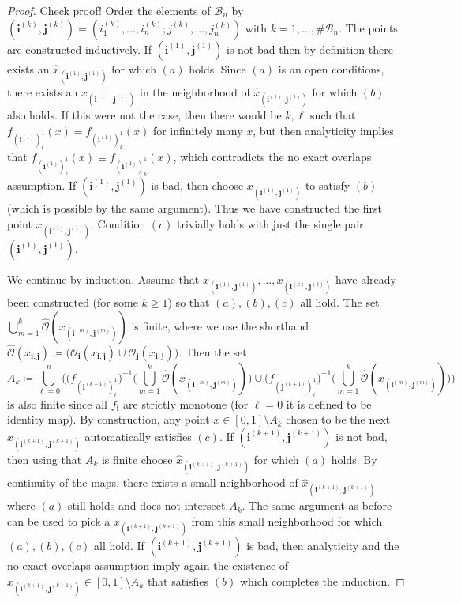\documentclass[12pt,]{article}
\theoremstyle{definition}
\theoremstyle{remark}
\newcommand{\0}{\mathbf{0}}
\newcommand{\bi}{\mathbf{i}}
\newcommand{\bj}{\mathbf{j}}
\begin{document}
{\begin{proof}{\color{red}Check proof!}
Order the elements of $\mathcal{B}_n$ by $(\bi^{(k)},\bj^{(k)})=(i_1^{(k)},\ldots,
i_n^{(k)};j_1^{(k)},\ldots,j_n^{(k)})$ with $k=1,\ldots,\#\mathcal{B}_n$. The points are constructed
inductively. If $(\bi^{(1)},\bj^{(1)})$ is not bad then by definition there exists an $\hat
x_{(\bi^{(1)},\bj^{(1)})}$ for which $(a)$ holds. Since $(a)$ is an open conditions, there exists an
$x_{(\bi^{(1)},\bj^{(1)})}$ in the neighborhood of $\hat x_{(\bi^{(1)},\bj^{(1)})}$ for which $(b)$
also holds. If this were not the case, then there would be $k,\ell$ such that
$f_{(\bi^{(1)})_{\ell}^1}(x)=f_{(\bi^{(1)})_{k}^1}(x)$ for infinitely many $x$, but then analyticity
implies that $f_{(\bi^{(1)})_{\ell}^1}(x)\equiv f_{(\bi^{(1)})_{k}^1}(x)$, which contradicts the no
exact overlaps assumption. If $(\bi^{(1)},\bj^{(1)})$ is bad, then choose
$x_{(\bi^{(1)},\bj^{(1)})}$ to satisfy $(b)$ (which is possible by the same argument). Thus we have
constructed the first point $x_{(\bi^{(1)},\bj^{(1)})}$. Condition $(c)$ trivially holds with just
the single pair $(\bi^{(1)},\bj^{(1)})$. 

We continue by induction. Assume that $x_{(\bi^{(1)},\bj^{(1)})},\ldots,x_{(\bi^{(k)},\bj^{(k)})}$
have already been constructed (for some $k\geq 1$) so that $(a),(b),(c)$ all hold. The set
$\bigcup_{m=1}^k \widehat{\mathcal{O}}(x_{(\bi^{(m)},\bj^{(m)})})$ is finite, where we use the
shorthand  $\widehat{\mathcal{O}}(x_{\bi,\bj})\coloneqq\big(\mathcal{O}_{\bi}(x_{\bi,\bj})\cup
\mathcal{O}_{\bj}(x_{\bi,\bj})\big)$. Then the set
\begin{equation*}
A_k\coloneqq \bigcup_{\ell=0}^n \bigg( \big(f_{(\bi^{(k+1)})_{\ell}^1}\big)^{-1} \Big(
\bigcup_{m=1}^k \widehat{\mathcal{O}}(x_{(\bi^{(m)},\bj^{(m)})}) \Big) \cup
\big(f_{(\bj^{(k+1)})_{\ell}^1}\big)^{-1} \Big( \bigcup_{m=1}^k
\widehat{\mathcal{O}}(x_{(\bi^{(m)},\bj^{(m)})}) \Big) \bigg)
\end{equation*}
is also finite since all $f_{\bi}$ are strictly monotone (for $\ell=0$ it is defined to be identity
map). By construction, any point $x\in[0,1]\setminus A_k$ chosen to be the next
$x_{(\bi^{(k+1)},\bj^{(k+1)})}$ automatically satisfies $(c)$. If $(\bi^{(k+1)},\bj^{(k+1)})$ is not
bad, then using that $A_k$ is finite choose $\hat x_{(\bi^{(k+1)},\bj^{(k+1)})}$ for which $(a)$
holds. By continuity of the maps, there exists a small neighborhood of $\hat
x_{(\bi^{(k+1)},\bj^{(k+1)})}$ where $(a)$ still holds and does not intersect $A_k$. The same
argument as before can be used to pick a $x_{(\bi^{(k+1)},\bj^{(k+1)})}$ from this small
neighborhood for which $(a),(b),(c)$ all hold. If $(\bi^{(k+1)},\bj^{(k+1)})$ is bad, then
analyticity and the no exact overlaps assumption imply again the existence of
$x_{(\bi^{(k+1)},\bj^{(k+1)})}\in[0,1]\setminus A_k$ that satisfies $(b)$ which completes the
induction. 
\end{proof}

}
\end{document}
